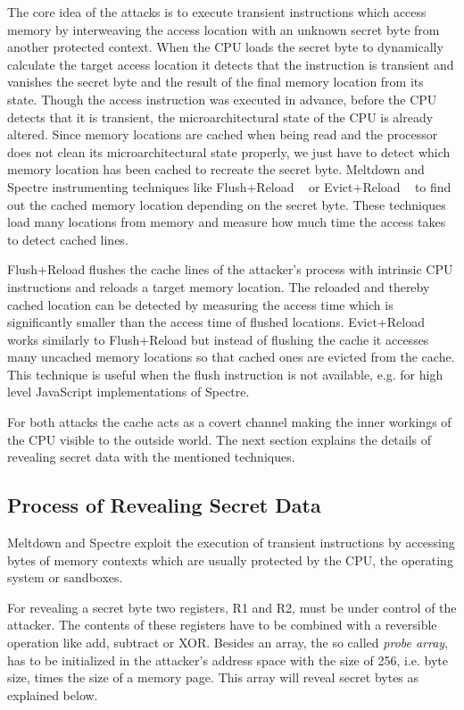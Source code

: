 \documentclass[a4paper,oneside,openright] {scrreprt}
\begin{document}
The core idea of the attacks is to execute transient instructions 
which access memory by interweaving the access location with an unknown secret byte from another protected context. 
When the CPU loads the secret byte to dynamically calculate the target access location 
it detects that the instruction is transient and vanishes the secret byte and the result of the final memory location from its state. 
Though the access instruction was executed in advance, before the CPU detects that it is transient, the microarchitectural state
 of the CPU is already altered.
 Since memory locations are cached when being read and the processor does not clean its microarchitectural state properly,
 we just have to detect which memory location has been cached to recreate the secret byte.
 Meltdown and Spectre instrumenting techniques like Flush+Reload ~\cite{yarom2014flush} 
 or Evict+Reload ~\cite{gruss2015cache} to find out the cached memory location depending on the secret byte.
These techniques load many locations from memory and measure how much time the access takes to detect cached lines.

Flush+Reload flushes the cache lines of the attacker's process with intrinsic CPU instructions and reloads a target memory location.
The reloaded and thereby cached location can be detected by measuring the access time which is significantly smaller than the access
time of flushed locations.
Evict+Reload works similarly to Flush+Reload but instead of flushing the cache it accesses many uncached memory
locations so that cached ones are evicted from the cache.
This technique is useful when the flush instruction is not available, e.g. for high level JavaScript implementations of Spectre. 

For both attacks the cache acts as a covert channel making the inner workings of the CPU visible to the outside world. 
The next section explains the details of revealing secret data with the mentioned techniques. 

\subsection{Process of Revealing Secret Data}
\label{ch:intro:motivation:A}

Meltdown and Spectre exploit the execution of transient instructions by accessing bytes of memory contexts 
 which are usually protected by the CPU, the operating system or sandboxes. 

For revealing a secret byte two registers, R1 and R2, must be under control of the attacker. The contents of these registers have to be 
combined with a reversible operation like add, subtract or XOR. Besides an array, the so called \textit{probe array}, has to be 
initialized in the attacker's address space with the size of 256, i.e. byte size, times the size of a memory page. This array will 
reveal secret bytes as explained below.
\end{document}
